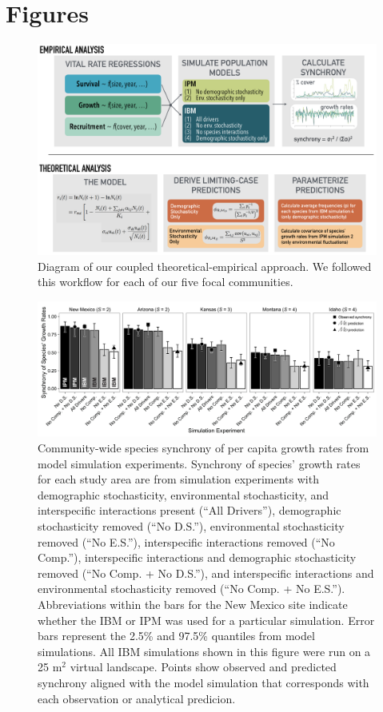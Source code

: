 \documentclass[11pt,]{article}
\begin{document}
\pagebreak{}

\section{Figures}

\begin{figure}[!ht]
  \centering
      \includegraphics[width=6in]{./components/formatted_figures/synchrony_flowchart_bw.png}
  \caption{Diagram of our coupled theoretical-empirical approach. We followed this workflow for each of our five focal communities.}
\end{figure}

\pagebreak{}

\begin{figure}[!ht]
  \centering
      \includegraphics[width=6in]{./components/formatted_figures/formatted_figure1.png}
  \caption{Community-wide species synchrony of per capita growth rates from model simulation experiments. Synchrony of species' growth rates for each study area are from simulation experiments with demographic stochasticity, environmental stochasticity, and interspecific interactions present (``All Drivers''), demographic stochasticity removed (``No D.S.''), environmental stochasticity removed (``No E.S.''), interspecific interactions removed (``No Comp.''), interspecific interactions and demographic stochasticity removed (``No Comp. + No D.S.''), and interspecific interactions and environmental stochasticity removed (``No Comp. + No E.S.''). Abbreviations within the bars for the New Mexico site indicate whether the IBM or IPM was used for a particular simulation. Error bars represent the 2.5\% and 97.5\% quantiles from model simulations. All IBM simulations shown in this figure were run on a 25 $\text{m}^2$ virtual landscape. Points show observed and predicted synchrony aligned with the model simulation that corresponds with each observation or analytical predicion.}
\end{figure}
\end{document}
